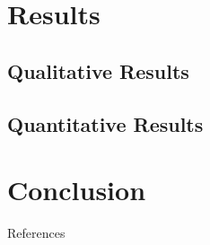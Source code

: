 \documentclass[10pt,frenchb]{beamer}
\begin{document}
\section{Results}

\subsection{Qualitative Results}


\begin{frame}


\end{frame}

\subsection{Quantitative Results}

\begin{frame}




\end{frame}

\section{Conclusion}

 \begin{frame}


\end{frame}

\begin{frame}[allowframebreaks]{References}
 

\end{frame}
\end{document}
